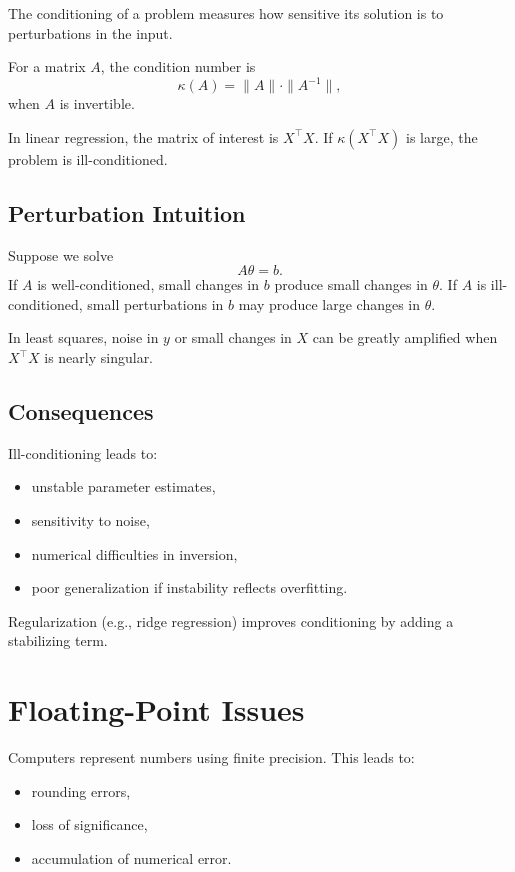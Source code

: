 The conditioning of a problem measures how sensitive its solution is to perturbations in the input.

\begin{definition}
For a matrix $A$, the condition number is
\[
\kappa(A)=\|A\|\cdot \|A^{-1}\|,
\]
when $A$ is invertible.
\end{definition}

In linear regression, the matrix of interest is $X^\top X$. If $\kappa(X^\top X)$ is large, the problem is ill-conditioned.

\subsection{Perturbation Intuition}

Suppose we solve
\[
A\theta=b.
\]
If $A$ is well-conditioned, small changes in $b$ produce small changes in $\theta$. If $A$ is ill-conditioned, small perturbations in $b$ may produce large changes in $\theta$.

In least squares, noise in $y$ or small changes in $X$ can be greatly amplified when $X^\top X$ is nearly singular.

\subsection{Consequences}

Ill-conditioning leads to:
\begin{itemize}
    \item unstable parameter estimates,
    \item sensitivity to noise,
    \item numerical difficulties in inversion,
    \item poor generalization if instability reflects overfitting.
\end{itemize}

Regularization (e.g., ridge regression) improves conditioning by adding a stabilizing term.

\section{Floating-Point Issues}

Computers represent numbers using finite precision. This leads to:
\begin{itemize}
    \item rounding errors,
    \item loss of significance,
    \item accumulation of numerical error.
\end{itemize}


